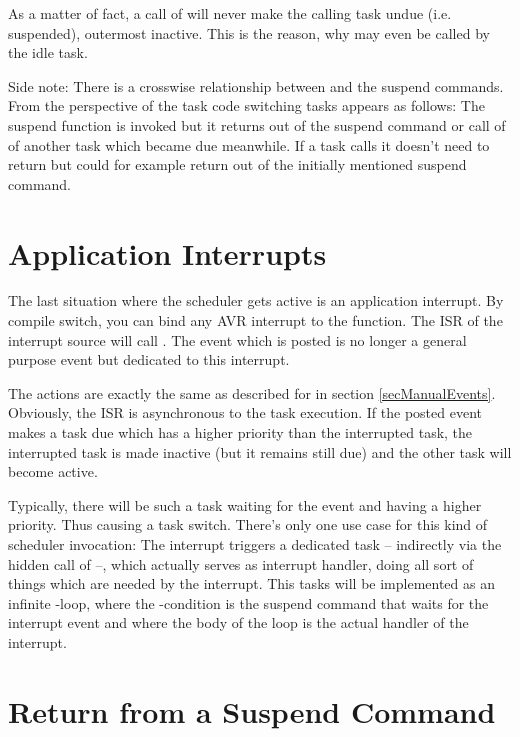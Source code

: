 As a matter of fact, a call of  will never make the
calling task undue (i.e. suspended), outermost inactive. This is the
reason, why  may even be called by the idle task.

Side note: There is a crosswise relationship between  and
the suspend commands. From the perspective of the task code switching
tasks appears as follows: The suspend function is invoked but it returns
out of the suspend command or call of  of another task
which became due meanwhile. If a task calls  it doesn't
need to return but could for example return out of the initially mentioned
suspend command.


\section{Application Interrupts}
\label{secInterruptEvents}

The last situation where the scheduler gets active is an application
interrupt. By compile switch, you can bind any AVR interrupt to the
 function. The ISR of the interrupt source will call
. The event which is posted is no longer a general purpose
event but dedicated to this interrupt.

The actions are exactly the same as described for  in
section \ref{secManualEvents}. Obviously, the ISR is asynchronous to the
task execution. If the posted event makes a task due which has a higher
priority than the interrupted task, the interrupted task is made inactive
(but it remains still due) and the other task will become active.

Typically, there will be such a task waiting for the event and having a
higher priority. Thus causing a task switch. There's only one use case for
this kind of scheduler invocation: The interrupt triggers a dedicated task
-- indirectly via the hidden call of  --, which actually
serves as interrupt handler, doing all sort of things which are needed by
the interrupt. This tasks will be implemented as an infinite
-loop, where the -condition is the suspend
command that waits for the interrupt event and where the body of the loop
is the actual handler of the interrupt.


\section{Return from a Suspend Command}
\label{secReturnFromSuspend}

